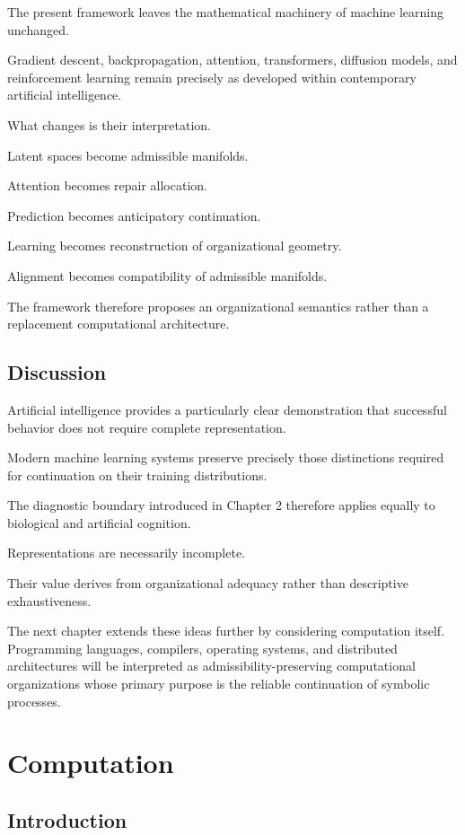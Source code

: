 \documentclass[11pt,oneside]{book}
\numberwithin{equation}{chapter}
\theoremstyle{definition}
\theoremstyle{plain}
\begin{document}
The present framework leaves the mathematical machinery of machine learning
unchanged.

Gradient descent, backpropagation, attention, transformers, diffusion
models, and reinforcement learning remain precisely as developed within
contemporary artificial intelligence.

What changes is their interpretation.

Latent spaces become admissible manifolds.

Attention becomes repair allocation.

Prediction becomes anticipatory continuation.

Learning becomes reconstruction of organizational geometry.

Alignment becomes compatibility of admissible manifolds.

The framework therefore proposes an organizational semantics rather than a
replacement computational architecture.

\section{Discussion}

Artificial intelligence provides a particularly clear demonstration that
successful behavior does not require complete representation.

Modern machine learning systems preserve precisely those distinctions
required for continuation on their training distributions.

The diagnostic boundary introduced in Chapter 2 therefore applies equally to
biological and artificial cognition.

Representations are necessarily incomplete.

Their value derives from organizational adequacy rather than descriptive
exhaustiveness.

The next chapter extends these ideas further by considering computation
itself. Programming languages, compilers, operating systems, and
distributed architectures will be interpreted as admissibility-preserving
computational organizations whose primary purpose is the reliable
continuation of symbolic processes.

\chapter{Computation}

\section{Introduction}
\end{document}
